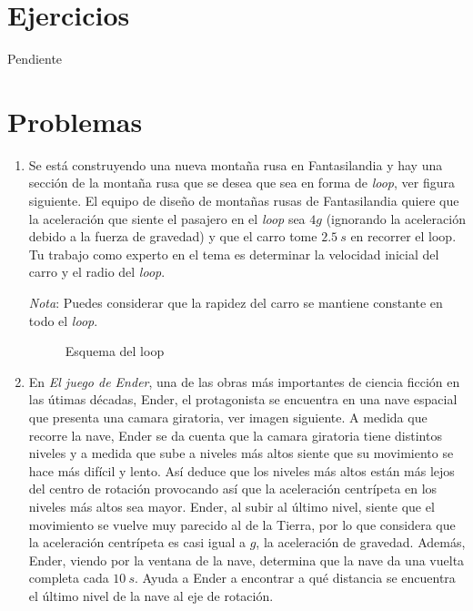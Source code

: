 \documentclass[letterpaper]{article}
\begin{document}
\section*{Ejercicios}

Pendiente

\section*{Problemas}

\begin{enumerate}

\item Se está construyendo una nueva montaña rusa en Fantasilandia y hay una sección de la montaña rusa que se desea que sea en forma de \emph{loop}, ver figura siguiente. El equipo de diseño de montañas rusas de Fantasilandia quiere que la aceleración que siente el pasajero en el \emph{loop} sea $4g$ (ignorando la aceleración debido a la fuerza de gravedad) y que el carro tome $2.5\ \si{s}$ en recorrer el loop. Tu trabajo como experto en el tema es determinar la velocidad inicial del carro y el radio del \emph{loop}.
 
\emph{Nota}: Puedes considerar que la rapidez del carro se mantiene constante en todo el \emph{loop}.

\begin{figure}[h]
\centering
{}
\caption{Esquema del loop}
\end{figure}
 
\item En \emph{El juego de Ender}, una de las obras más importantes de ciencia ficción en las útimas décadas, Ender, el protagonista se encuentra en una nave espacial que presenta una camara giratoria, ver imagen siguiente. A medida que recorre la nave, Ender se da cuenta que la camara giratoria tiene distintos niveles y a medida que sube a niveles más altos siente que su movimiento se hace más difícil y lento.  Así deduce que los niveles más altos están más lejos del centro de rotación provocando así que la aceleración centrípeta en los niveles más altos sea mayor. Ender, al subir al último nivel, siente que el movimiento se vuelve muy parecido al de la Tierra, por lo que considera que la aceleración centrípeta es casi igual a $g$, la aceleración de gravedad. Además, Ender, viendo por la ventana de la nave, determina que la nave da una vuelta completa cada $10\ \si{s}$. Ayuda a Ender a encontrar a qué distancia se encuentra el último nivel de la nave al eje de rotación.


\end{enumerate}
\end{document}
